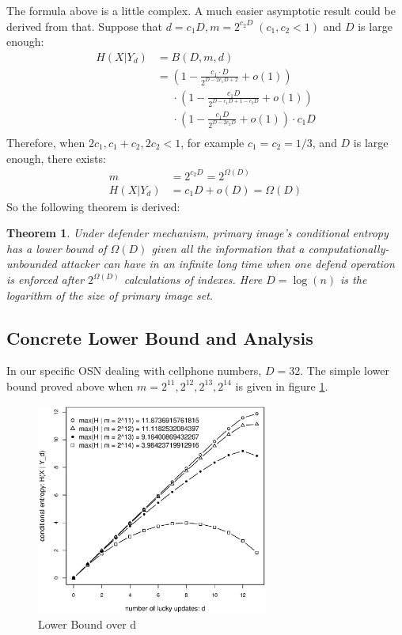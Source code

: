 \documentclass[10pt, conference, compsocconf]{IEEEtran}
\newtheorem{mytheorem}{Theorem}
\begin{document}
		The formula above is a little complex. A much easier asymptotic result
		could be derived from that. Suppose that
		$d = c_1 D, m = 2^{c_2 D} \; (c_1, c_2 < 1)$ and $D$ is large enough:
		\begin{align*}
			H(X | Y_d) &= B(D, m, d)\\
						&= \left(1-\frac{c_1 \cdot D}{ 2^{D-2 c_1 D+2} } + o(1) \right)\\
							&\;\;\;\;\; \cdot \left(1-\frac{c_1 D}{2^{D-c_1 D+1 - c_2 D}} + o(1) \right)\\
							&\;\;\;\;\; \cdot \left(1-\frac{c_1 D}{2^{D-2 c_2 D}} + o(1) \right) \cdot c_1 D\\
		\end{align*}
		Therefore, when $2c_1, c_1+c_2, 2c_2 < 1$, for example $c_1 = c_2 = 1/3$,
		and $D$ is large enough, there exists:
		\begin{align*}
			m &= 2^{c_2 D} = 2^{\Omega(D)}\\
			H(X | Y_d) &= c_1D+o(D) = \Omega(D)
		\end{align*}		
		So the following theorem is derived:
		\begin{mytheorem}
			Under defender mechanism,
			primary image's conditional entropy has a lower bound of $\Omega(D)$
			given all the information
			that a computationally-unbounded attacker can
			have in an infinite long time when one defend operation
			is enforced after $2^{\Omega(D)}$ calculations of indexes.
			Here $D = \log(n)$ is the
			logarithm of the size of primary image set.
		\end{mytheorem}
		
	\subsection{Concrete Lower Bound and Analysis}
		In our specific OSN dealing with cellphone numbers, 
		$D = 32$.
		The simple lower
		bound proved above when $m = 2^{11}, 2^{12}, 2^{13}, 2^{14}$ is given
		in figure \ref{lb_m}.
		
		\begin{figure}[!t]
		\centering
		\includegraphics[width=3in, trim=0mm 0mm 0mm 20mm]{lb_m.eps}
		\caption{Lower Bound over d}\label{lb_m}
		\end{figure}		
\end{document}
